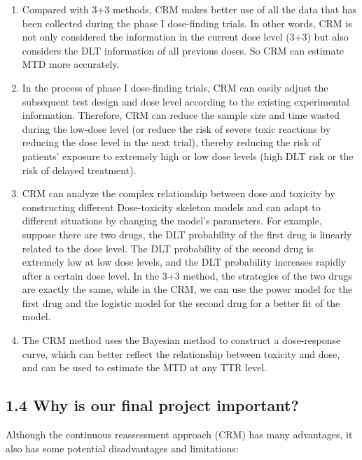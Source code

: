 \documentclass[
]{article}
\begin{document}
\begin{enumerate}
\def\labelenumi{\alph{enumi}.}
\item
  Compared with 3+3 methods, CRM makes better use of all the data that
  has been collected during the phase I dose-finding trials. In other
  words, CRM is not only considered the information in the current dose
  level (3+3) but also considers the DLT information of all previous
  doses. So CRM can estimate MTD more accurately.
\item
  In the process of phase I dose-finding trials, CRM can easily adjust
  the subsequent test design and dose level according to the existing
  experimental information. Therefore, CRM can reduce the sample size
  and time wasted during the low-dose level (or reduce the risk of
  severe toxic reactions by reducing the dose level in the next trial),
  thereby reducing the risk of patients' exposure to extremely high or
  low dose levels (high DLT risk or the risk of delayed treatment).
\item
  CRM can analyze the complex relationship between dose and toxicity by
  constructing different Dose-toxicity skeleton models and can adapt to
  different situations by changing the model's parameters. For example,
  suppose there are two drugs, the DLT probability of the first drug is
  linearly related to the dose level. The DLT probability of the second
  drug is extremely low at low dose levels, and the DLT probability
  increases rapidly after a certain dose level. In the 3+3 method, the
  strategies of the two drugs are exactly the same, while in the CRM, we
  can use the power model for the first drug and the logistic model for
  the second drug for a better fit of the model.
\item
  The CRM method uses the Bayesian method to construct a dose-response
  curve, which can better reflect the relationship between toxicity and
  dose, and can be used to estimate the MTD at any TTR level.
\end{enumerate}

\hypertarget{why-is-our-final-project-important}{%
\subsection{1.4 Why is our final project
important?}\label{why-is-our-final-project-important}}

Although the continuous reassessment approach (CRM) has many advantages,
it also has some potential disadvantages and limitations:
\end{document}
